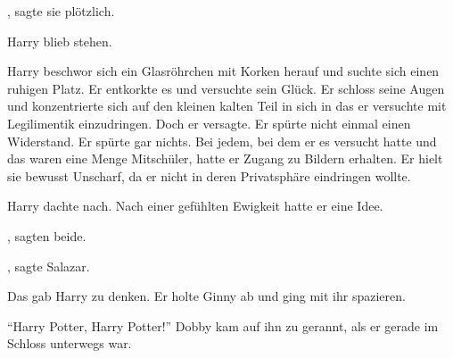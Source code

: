 




, sagte sie plötzlich.





Harry blieb stehen.



Harry beschwor sich ein Glasröhrchen mit Korken herauf und suchte sich einen ruhigen Platz. Er entkorkte es und versuchte sein Glück. Er schloss seine Augen und konzentrierte sich auf den kleinen kalten Teil in sich in das er versuchte mit Legilimentik einzudringen. Doch er versagte. Er spürte nicht einmal einen Widerstand. Er spürte gar nichts. Bei jedem, bei dem er es versucht hatte und das waren eine Menge Mitschüler, hatte er Zugang zu Bildern erhalten. Er hielt sie bewusst Unscharf, da er nicht in deren Privatsphäre eindringen wollte.

Harry dachte nach. Nach einer gefühlten Ewigkeit hatte er eine Idee. 

, sagten beide.


, sagte Salazar.



Das gab Harry zu denken. Er holte Ginny ab und ging mit ihr spazieren.

\enquote{Harry Potter, Harry Potter!} Dobby kam auf ihn zu gerannt, als er gerade im Schloss unterwegs war.

